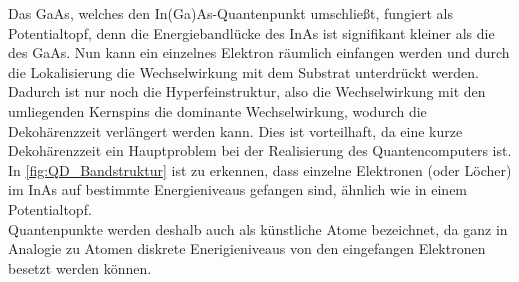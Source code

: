 \noindent Das GaAs, welches den In(Ga)As-Quantenpunkt umschließt, fungiert als Potentialtopf, denn die Energiebandlücke des InAs ist 
signifikant kleiner als die des GaAs. Nun kann ein einzelnes Elektron räumlich einfangen werden und durch die Lokalisierung 
die Wechselwirkung mit dem Substrat unterdrückt werden. Dadurch ist nur noch die Hyperfeinstruktur, also die Wechselwirkung mit den 
umliegenden Kernspins die dominante Wechselwirkung, wodurch die Dekohärenzzeit verlängert werden kann. Dies ist vorteilhaft, da 
eine kurze Dekohärenzzeit ein Hauptproblem bei der Realisierung des Quantencomputers ist.\\
In \autoref{fig:QD_Bandstruktur} ist zu erkennen, dass einzelne Elektronen (oder Löcher)
im InAs auf bestimmte Energieniveaus gefangen sind, ähnlich wie in einem Potentialtopf.\\
Quantenpunkte werden deshalb auch als \glqq künstliche Atome\grqq{} bezeichnet, da ganz in Analogie zu Atomen diskrete Enerigieniveaus 
von den eingefangen Elektronen besetzt werden können.
%